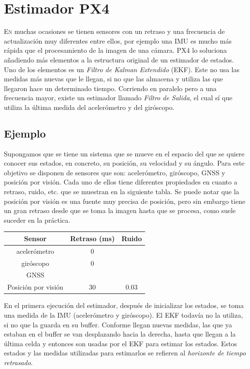 \chapter{Estimador PX4}\label{chp-01}

\lettrine[lraise=-0.1, lines=2, loversize=0.2]{E}{n} muchas ocasiones se tienen sensores con un retraso y una frecuencia de actualización muy diferentes entre ellos, por ejemplo una IMU es mucho más rápida que el procesamiento de la imagen de una cámara. PX4 lo soluciona añadiendo más elementos a la estructura original de un estimador de estados. Uno de los elementos es un \textit{Filtro de Kalman Extendido} (EKF). Este no usa las medidas más nuevas que le llegan, si no que las almacena y utiliza las que llegaron hace un determinado tiempo. Corriendo en paralelo pero a una frecuencia mayor, existe un estimador llamado \textit{Filtro de Salida}, el cual sí que utiliza la última medida del acelerómetro y del giróscopo. 

\section{Ejemplo}
Supongamos que se tiene un sistema que se mueve en el espacio del que se quiere conocer sus estados, en concreto, su posición, su velocidad y su ángulo. Para este objetivo se disponen de sensores que son: acelerómetro, giróscopo, GNSS y posición por visión. Cada uno de ellos tiene diferentes propiedades en cuanto a retraso, ruido, etc. que se muestran en la siguiente tabla. Se puede notar que la posición por visión es una fuente muy precisa de posición, pero sin embargo tiene un gran retraso desde que se toma la imagen hasta que se procesa, como suele suceder en la práctica. 
\begin{tabular}{|c|c|c|}
Sensor			& Retraso (ms) 	& Ruido 	\\ \hline 
acelerómetro 		& 0 		& 	      	\\ 
giróscopo 		& 0 		& 	      	\\ 
GNSS      		& 		& 	      	\\ %
Posición por visión 	& 30 		& 0.03 	
\end{tabular}


En el primera ejecución del estimador, después de inicializar los estados, se toma una medida de la IMU (acelerómetro y giróscopo). El EKF todavía no la utiliza, si no que la guarda en su buffer. Conforme llegan nuevas medidas, las que ya estaban en el buffer se van desplazando hacia la derecha, hasta que llegan a la última celda y entonces son usadas por el EKF para estimar los estados. Estos estados y las medidas utilizadas para estimarlos se refieren al \textit{horizonte de tiempo retrasado}. 

